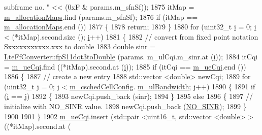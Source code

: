 \begin{DoxyCode}
{       subframe no. "} << (0xF & params.m\_sfnSf));
1875         itMap = \hyperlink{classns3_1_1TtaFfMacScheduler_a8931533e6964833d4e1da1e8c6d20313}{m\_allocationMaps}.find (params.m\_sfnSf);
1876         \textcolor{keywordflow}{if} (itMap == \hyperlink{classns3_1_1TtaFfMacScheduler_a8931533e6964833d4e1da1e8c6d20313}{m\_allocationMaps}.end ())
1877           \{
1878             \textcolor{keywordflow}{return};
1879           \}
1880         \textcolor{keywordflow}{for} (uint32\_t \hyperlink{bernuolliDistribution_8m_a6f6ccfcf58b31cb6412107d9d5281426}{i} = 0; \hyperlink{bernuolliDistribution_8m_a6f6ccfcf58b31cb6412107d9d5281426}{i} < (*itMap).second.size (); \hyperlink{bernuolliDistribution_8m_a6f6ccfcf58b31cb6412107d9d5281426}{i}++)
1881           \{
1882             \textcolor{comment}{// convert from fixed point notation Sxxxxxxxxxxx.xxx to double}
1883             \textcolor{keywordtype}{double} sinr = \hyperlink{classns3_1_1LteFfConverter_aa5d8c2a8f988dbd63da91818c18666eb}{LteFfConverter::fpS11dot3toDouble} (params.
      m\_ulCqi.m\_sinr.at (\hyperlink{bernuolliDistribution_8m_a6f6ccfcf58b31cb6412107d9d5281426}{i}));
1884             itCqi = \hyperlink{classns3_1_1TtaFfMacScheduler_ac07e60af8c68f1cfac9b8666119af78f}{m\_ueCqi}.find ((*itMap).second.at (\hyperlink{bernuolliDistribution_8m_a6f6ccfcf58b31cb6412107d9d5281426}{i}));
1885             \textcolor{keywordflow}{if} (itCqi == \hyperlink{classns3_1_1TtaFfMacScheduler_ac07e60af8c68f1cfac9b8666119af78f}{m\_ueCqi}.end ())
1886               \{
1887                 \textcolor{comment}{// create a new entry}
1888                 std::vector <double> newCqi;
1889                 \textcolor{keywordflow}{for} (uint32\_t j = 0; j < \hyperlink{classns3_1_1TtaFfMacScheduler_af263a06ea69ff1d096ddb48df0ac7f81}{m\_cschedCellConfig}.
      \hyperlink{structns3_1_1FfMacCschedSapProvider_1_1CschedCellConfigReqParameters_a5ab5b102878e6e7e7727a14af4a64d2f}{m\_ulBandwidth}; j++)
1890                   \{
1891                     \textcolor{keywordflow}{if} (\hyperlink{bernuolliDistribution_8m_a6f6ccfcf58b31cb6412107d9d5281426}{i} == j)
1892                       \{
1893                         newCqi.push\_back (sinr);
1894                       \}
1895                     \textcolor{keywordflow}{else}
1896                       \{
1897                         \textcolor{comment}{// initialize with NO\_SINR value.}
1898                         newCqi.push\_back (\hyperlink{cqa-ff-mac-scheduler_8h_a520d71777be043568160c783a9c65fd5}{NO\_SINR});
1899                       \}
1900 
1901                   \}
1902                 \hyperlink{classns3_1_1TtaFfMacScheduler_ac07e60af8c68f1cfac9b8666119af78f}{m\_ueCqi}.insert (std::pair <uint16\_t, std::vector <double> > ((*itMap).second.at (

\end{DoxyCode}
